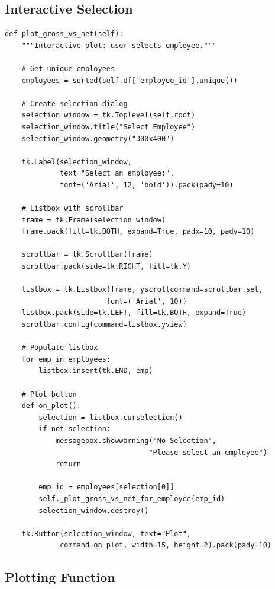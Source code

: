 \subsection{Interactive Selection}

\begin{lstlisting}[style=pythonstyle]
def plot_gross_vs_net(self):
    """Interactive plot: user selects employee."""
    
    # Get unique employees
    employees = sorted(self.df['employee_id'].unique())
    
    # Create selection dialog
    selection_window = tk.Toplevel(self.root)
    selection_window.title("Select Employee")
    selection_window.geometry("300x400")
    
    tk.Label(selection_window, 
             text="Select an employee:",
             font=('Arial', 12, 'bold')).pack(pady=10)
    
    # Listbox with scrollbar
    frame = tk.Frame(selection_window)
    frame.pack(fill=tk.BOTH, expand=True, padx=10, pady=10)
    
    scrollbar = tk.Scrollbar(frame)
    scrollbar.pack(side=tk.RIGHT, fill=tk.Y)
    
    listbox = tk.Listbox(frame, yscrollcommand=scrollbar.set,
                        font=('Arial', 10))
    listbox.pack(side=tk.LEFT, fill=tk.BOTH, expand=True)
    scrollbar.config(command=listbox.yview)
    
    # Populate listbox
    for emp in employees:
        listbox.insert(tk.END, emp)
    
    # Plot button
    def on_plot():
        selection = listbox.curselection()
        if not selection:
            messagebox.showwarning("No Selection", 
                                  "Please select an employee")
            return
        
        emp_id = employees[selection[0]]
        self._plot_gross_vs_net_for_employee(emp_id)
        selection_window.destroy()
    
    tk.Button(selection_window, text="Plot",
             command=on_plot, width=15, height=2).pack(pady=10)
\end{lstlisting}

\subsection{Plotting Function}

